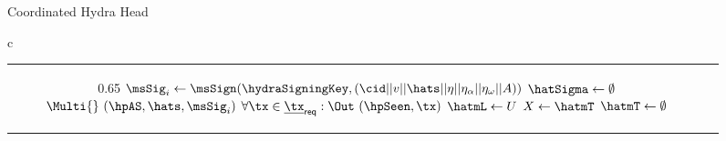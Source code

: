 \begin{figure}[t!]
\begin{algobox}{Coordinated Hydra Head}
\begin{tabular}{c}
\begin{tabular}{c@{}c}
{\begin{walgo}{0.65}
{{								$\msSig_i \gets \msSign(\hydraSigningKey, (\cid || v || \hats || \eta || \eta_\alpha || \eta_\omega || A))$ \;
								$\hatSigma \gets \emptyset$ \;
								$\Multi{}~(\hpAS,\hats,\msSig_i)$ \;
								$\forall \tx \in \underline{\tx}_{\mathsf{req}}: \Out~(\hpSeen,\tx)$ \;
								$\hatmL \gets U$ \;
								$X\gets\hatmT$ \;
								$\hatmT\gets\emptyset$ \;
								\For{$\tx\in X : \hatmL\applytx \tx \not=\bot$}{
									$\hatmT\gets\hatmT\cup\{\tx\}$ \;
									$\hatmL\gets\hatmL\applytx \tx$ \;
								}
							}
						}
						\vspace{12pt}
					\end{walgo}
				} &

				\adjustbox{valign=t,scale=\sfact}{
					\begin{walgo}{0.7}
						\On{$(\hpAS,s,\msSig_j)$ from $\party_j$}{
							\Req{} $s \in \{\hats,\hats+1\}$ \;
							\Wait{$\hats=s$}{
								\Req{} $(j, \cdot) \notin \hatSigma$ \;
								$\hatSigma[j] \gets \sigma_{j}$ \;
								\If{$\forall k \in [1..n]: (k,\cdot) \in \hatSigma$}{
									$\msCSig \gets \msComb(\hydraKeys^{setup}, \hatSigma)$ \;

									$U_\omega \gets \mathsf{outputs}(\tx_\omega)$ \;
									$\eta \gets \combine(\hatmU)$ \;
									$\eta_\alpha \gets \combine(U_\alpha)$ \;
									$\eta_\omega \gets \combine(U_\omega)$ \;
									$A \gets \accUTxO(\hatmU \cup U_\alpha \cup U_\omega)$ \;
									\Req{} $\msVfy(\hydraKeysAgg, (\cid || \hatv || \hats || \eta || \eta_\alpha || \eta_\omega || A), \msCSig)$ \;
									$\bar{\mc S} \gets \Sno(\hatv, \hats, \hatmT, \hatmU, U_\alpha, U_\omega, A)$ \;
									$\bar{\mc S}.\sigma \gets \msCSig$ \;
									$\forall \tx \in \mT_{\mathsf{req}} : \Out (\hpConf,\tx)$ \;

									\If{$\bar{\mc S}.U_\omega \ne \bot$}{
										$\PostTx{}~(\mathtt{decrementTx}, \hatv, \hats, \eta, \eta_\alpha, \eta_\omega, \bar{\mc S}.A)$ \;
									}

									\If{$\bar{\mc S}.U_\alpha \ne \bot$}{
										$\PostTx{}~(\mathtt{incrementTx}, \hatv, \hats, \eta, \eta_\alpha, \eta_\omega, \bar{\mc S}.A)$ \;
									}

}}}
\end{walgo}}
\end{tabular}
\end{tabular}
\end{algobox}
\end{figure}
